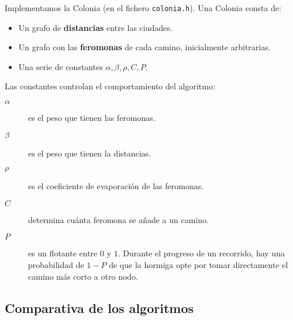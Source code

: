 Implementamos la Colonia (en el fichero \texttt{colonia.h}). Una Colonia consta de:

\begin{itemize}
  \item Un grafo de \textbf{distancias} entre las ciudades.
  \item Un grafo con las \textbf{feromonas} de cada camino, inicialmente arbitrarias.
  \item Una serie de constantes $\alpha, \beta, \rho, C, P$.
\end{itemize}

Las constantes controlan el comportamiento del algoritmo:

\begin{description}
  \item[$\alpha$] es el peso que tienen las feromonas.
  \item[$\beta$] es el peso que tienen la distancias.
  \item[$\rho$] es el coeficiente de evaporación de las feromonas.
  \item[$C$] determina cuánta feromona se añade a un camino.
  \item[$P$] es un flotante entre $0$ y $1$. Durante el progreso de un recorrido, hay
  una probabilidad de $1-P$ de que la hormiga opte por tomar directamente el camino
  más corto a otro nodo.
\end{description}

\subsection{Comparativa de los algoritmos}
